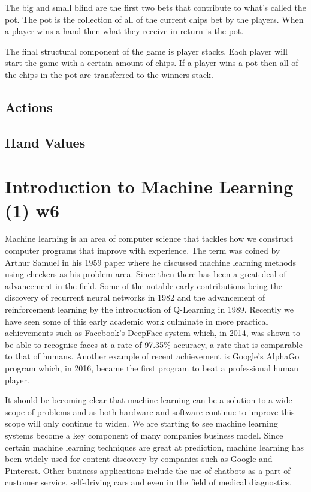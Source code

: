 The big and small blind are the first two bets that contribute to what's called the pot.
The pot is the collection of all of the current chips bet by the players.
When a player wins a hand then what they receive in return is the pot.

The final structural component of the game is player stacks.
Each player will start the game with a certain amount of chips.
If a player wins a pot then all of the chips in the pot are transferred to the winners stack.
\subsection{Actions}\label{subsec:actions}
\subsection{Hand Values}\label{subsec:handValues}

\section{Introduction to Machine Learning (1) w6}\label{sec:introductionToMachineLearning}

Machine learning is an area of computer science that tackles how we construct computer programs that improve
with experience\cite{mitchell1997machine}.
The term was coined by Arthur Samuel in his 1959 paper where he discussed machine learning methods using
checkers as his problem area.
Since then there has been a great deal of advancement in the field.
Some of the notable early contributions being the discovery of recurrent neural networks in 1982 and
the advancement of reinforcement learning by the introduction of Q-Learning in 1989.
Recently we have seen some of this early academic work culminate in more practical achievements such as
Facebook's DeepFace system which, in 2014,  was shown to be able to recognise faces at a rate of 97.35\% accuracy,
a rate that is comparable to that of humans.
Another example of recent achievement is Google's AlphaGo program which, in 2016, became the first program to beat
a professional human player.

It should be becoming clear that machine learning can be a solution to a wide scope of problems and as
both hardware and software continue to improve this scope will only continue to widen.
We are starting to see machine learning systems become a key component of many companies business model.
Since certain machine learning techniques are great at prediction, machine learning has been widely used
for content discovery by companies such as Google and Pinterest.
Other business applications include the use of chatbots as a part of customer service, self-driving cars
and even in the field of medical diagnostics.

